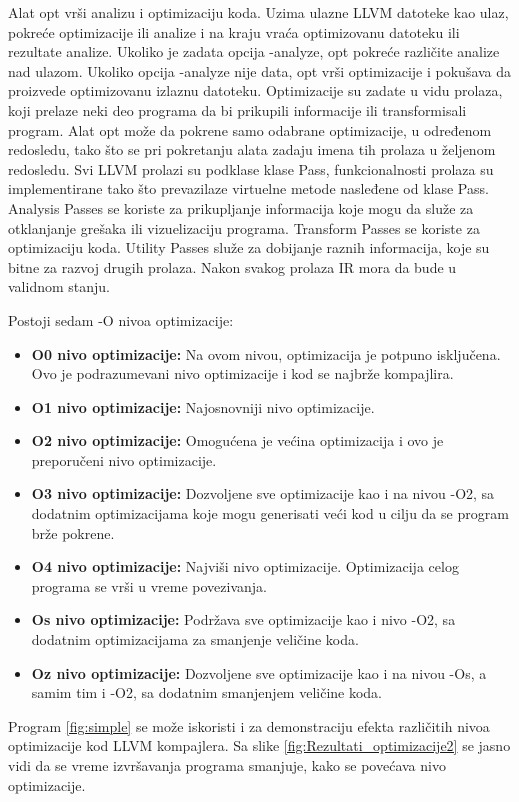 \documentclass[a4paper]{article}
\begin{document}
Alat opt vrši analizu i optimizaciju koda. Uzima ulazne LLVM datoteke kao ulaz, pokreće optimizacije ili analize i na kraju vraća optimizovanu datoteku ili rezultate analize. Ukoliko je zadata opcija -analyze, opt pokreće različite analize nad ulazom. Ukoliko opcija  -analyze nije data, opt vrši optimizacije i pokušava da proizvede optimizovanu izlaznu datoteku. Optimizacije su zadate u vidu prolaza, koji prelaze neki deo programa da bi prikupili informacije ili transformisali program. Alat opt može da pokrene samo odabrane optimizacije, u određenom redosledu, tako što se pri pokretanju alata zadaju imena tih prolaza u željenom redosledu. Svi LLVM prolazi su podklase klase Pass, funkcionalnosti prolaza su implementirane tako što prevazilaze virtuelne metode nasleđene od klase Pass. Analysis Passes se koriste za prikupljanje informacija koje mogu da služe za otklanjanje grešaka ili vizuelizaciju programa. Transform Passes se koriste za optimizaciju koda. Utility Passes služe za dobijanje raznih informacija, koje su bitne za razvoj drugih prolaza. Nakon svakog prolaza IR mora da bude u validnom stanju.

Postoji sedam -O nivoa optimizacije: 
\begin{itemize}
\item \textbf{O0 nivo optimizacije:} Na ovom nivou, optimizacija je potpuno isključena. Ovo je podrazumevani nivo optimizacije i kod se najbrže kompajlira.
\item \textbf{O1 nivo optimizacije:} Najosnovniji nivo optimizacije.
\item \textbf{O2 nivo optimizacije:} Omogućena je većina optimizacija i ovo je preporučeni nivo optimizacije.
\item \textbf{O3 nivo optimizacije:} Dozvoljene sve optimizacije kao i na nivou -O2, sa dodatnim optimizacijama koje mogu generisati veći kod u cilju da se program brže pokrene.
\item \textbf{O4 nivo optimizacije:} Najviši nivo optimizacije. Optimizacija celog programa se vrši u vreme povezivanja. 
\item \textbf{Os nivo optimizacije:} Podržava sve optimizacije kao i nivo -O2, sa dodatnim optimizacijama za smanjenje veličine koda.
\item \textbf{Oz nivo optimizacije:} Dozvoljene sve optimizacije kao i na nivou -Os, a samim tim i -O2,  sa dodatnim smanjenjem veličine koda. \cite{opt} \cite{pass} \cite{pass2}
\end{itemize}

Program \ref{fig:simple} se može iskoristi i za demonstraciju efekta različitih nivoa optimizacije kod LLVM kompajlera. Sa slike \ref{fig:Rezultati_optimizacije2} se jasno vidi da se vreme izvršavanja programa smanjuje, kako se povećava nivo optimizacije.
\end{document}
